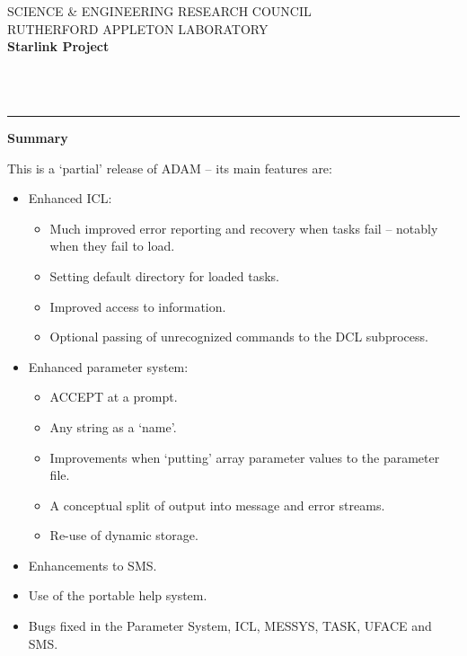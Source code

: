 \thispagestyle{empty}
SCIENCE \& ENGINEERING RESEARCH COUNCIL \hfill \stardocname\\
RUTHERFORD APPLETON LABORATORY\\
{\large\bf Starlink Project\\}
{\large\bf \stardoccategory\ \stardocnumber}
\begin{flushright}
\stardocauthors\\
\stardocdate
\end{flushright}
\vspace{-4mm}
\rule{\textwidth}{0.5mm}
\vspace{5mm}
\begin{center}
{\Large\bf \stardoctitle}
\end{center}
\vspace{20mm}
\begin{center}
{\Large\bf Summary}
\end{center}
This is a `partial' release of ADAM -- its main features are:
\begin{itemize}
\item Enhanced ICL:
\begin{itemize}
\item Much improved error reporting and recovery when tasks fail -- notably
when they fail to load.
\item Setting default directory for loaded tasks.
\item Improved access to information.
\item Optional passing of unrecognized commands to the DCL subprocess.
\end{itemize}
\item Enhanced parameter system:
\begin{itemize}
\item ACCEPT at a prompt.
\item Any string as a `name'.
\item Improvements when `putting' array parameter values to the parameter file.
\item A conceptual split of output into message and error streams.
\item Re-use of dynamic storage.
\end{itemize}
\item Enhancements to SMS.
\item Use of the portable help system.
\item Bugs fixed in the Parameter System, ICL, MESSYS, TASK, UFACE and SMS.
\end{itemize}

